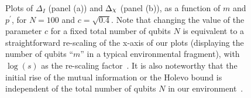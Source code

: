 \documentclass[aps,prl,showpacs,amsmath,amssymb,amsfonts,lengthcheck,onecolumn,longbibliography,superscriptaddress]{revtex4-2}
\newcommand{\+}         {\dagger}
\DeclareRobustCommand{\rchi}{{\mathpalette\irchi\relax}}
\newcommand{\irchi}[2]{\raisebox{\depth}{$#1\chi$}}
\begin{document}
\begin{figure}[h!]
	\centering
	\caption[]{\label{delta}Plots of $\Delta_{{I}}$ (panel (a)) and $\Delta_{\rchi}$ (panel (b)), as a function of $m$ and $p^{\prime}$, for $N=100$ and $c=\sqrt{0.4}$. Note that changing the value of the parameter $c$ for a fixed total number of qubits $N$ is equivalent to a straightforward re-scaling of the x-axis of our plots (displaying the number of qubits ``$m$'' in a typical environmental fragment), with $\log(s)$ as the re-scaling factor~\cite{darwint1}. It is also noteworthy that the initial rise of the mutual information or the Holevo bound is independent of the total number of qubits $N$ in our environment~\cite{darwint1}.}
\end{figure}
\end{document}
